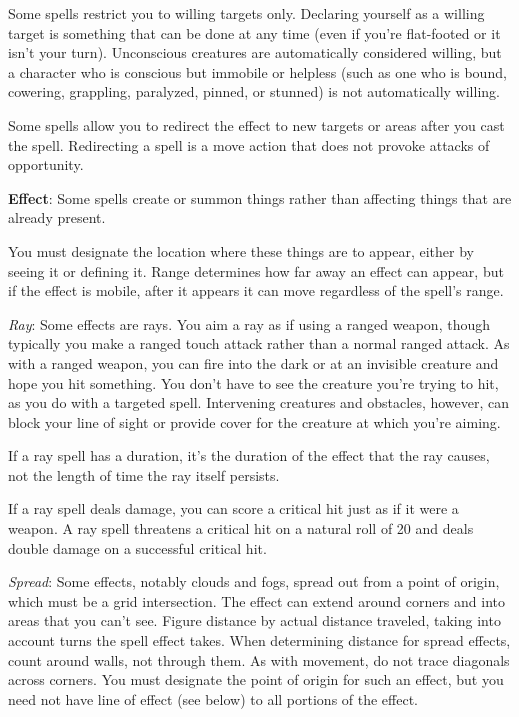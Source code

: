 Some spells restrict you to willing targets only. Declaring yourself as a willing target is something that can be done at any time (even if you're flat-footed or it isn't your turn). Unconscious creatures are automatically considered willing, but a character who is conscious but immobile or helpless (such as one who is bound, cowering, grappling, paralyzed, pinned, or stunned) is not automatically willing.
				
Some spells allow you to redirect the effect to new targets or areas after you cast the spell. Redirecting a spell is a move action that does not provoke attacks of opportunity.
				
\textbf{Effect}: Some spells create or summon things rather than affecting things that are already present.
				
You must designate the location where these things are to appear, either by seeing it or defining it. Range determines how far away an effect can appear, but if the effect is mobile, after it appears it can move regardless of the spell's range.
				
\textit{Ray}: Some effects are rays. You aim a ray as if using a ranged weapon, though typically you make a ranged touch attack rather than a normal ranged attack. As with a ranged weapon, you can fire into the dark or at an invisible creature and hope you hit something. You don't have to see the creature you're trying to hit, as you do with a targeted spell. Intervening creatures and obstacles, however, can block your line of sight or provide cover for the creature at which you're aiming.
				
If a ray spell has a duration, it's the duration of the effect that the ray causes, not the length of time the ray itself persists.
				
If a ray spell deals damage, you can score a critical hit just as if it were a weapon. A ray spell threatens a critical hit on a natural roll of 20 and deals double damage on a successful critical hit.
				
\textit{Spread}: Some effects, notably clouds and fogs, spread out from a point of origin, which must be a grid intersection. The effect can extend around corners and into areas that you can't see. Figure distance by actual distance traveled, taking into account turns the spell effect takes. When determining distance for spread effects, count around walls, not through them. As with movement, do not trace diagonals across corners. You must designate the point of origin for such an effect, but you need not have line of effect (see below) to all portions of the effect.


